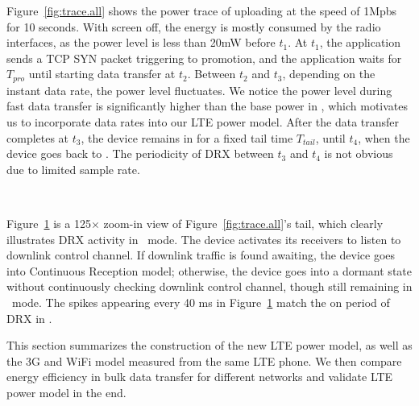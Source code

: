 Figure~\ref{fig:trace.all} shows the power trace of uploading at the speed of 1Mpbs for 10 seconds. With screen off, the energy is mostly consumed by the radio interfaces, as the power level is less than 20mW before $t_1$. At $t_1$, the application sends a TCP {\sf SYN} packet triggering \RI to \RC promotion, and the application waits for $T_{pro}$ until starting data transfer at $t_2$. Between $t_2$ and $t_3$, depending on the instant data rate, the power level fluctuates. We notice the power level during fast data transfer is significantly higher than the base power in \RC, which motivates us to incorporate data rates into our LTE power model. After the data transfer completes at $t_3$, the device remains in \RC for a fixed tail time $T_{tail}$, until $t_4$, when the device goes back to \RI. The periodicity of DRX between $t_3$ and $t_4$ is not obvious due to limited sample rate.


\begin{figure}[h]
\centering
{} \\
\label{fig:trace.zoom}
\end{figure}

Figure~\ref{fig:trace.zoom} is a 125$\times$ zoom-in view of Figure~\ref{fig:trace.all}'s tail, which clearly illustrates DRX activity in \RC~mode. The device activates its receivers to listen to downlink control channel. If downlink traffic is found awaiting, the device goes into Continuous Reception model; otherwise, the device goes into a dormant state without continuously checking downlink control channel, though still remaining in \RC~mode. The spikes appearing every 40 ms in Figure~\ref{fig:trace.zoom} match the on period of DRX in \RC.



This section summarizes the construction of the new LTE power model, as well as the 3G and WiFi model measured from the same LTE phone. We then compare energy efficiency in bulk data transfer for different networks and validate LTE power model in the end.

